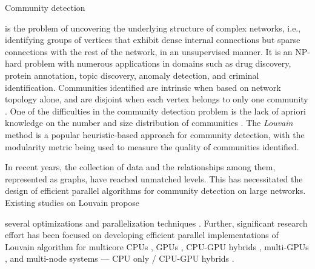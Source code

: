 Community detection is the problem of uncovering the underlying structure of complex networks, i.e., identifying groups of vertices that exhibit dense internal connections but sparse connections with the rest of the network, in an unsupervised manner. It is an NP-hard problem with numerous applications in domains such as drug discovery, protein annotation, topic discovery, anomaly detection, and criminal identification. Communities identified are intrinsic when based on network topology alone, and are disjoint when each vertex belongs to only one community \cite{com-gregory10}. One of the difficulties in the community detection problem is the lack of apriori knowledge on the number and size distribution of communities \cite{com-blondel08}. The \textit{Louvain} method \cite{com-blondel08} is a popular heuristic-based approach for community detection, with the modularity metric \cite{com-newman06} being used to measure the quality of communities identified.

In recent years, the collection of data and the relationships among them, represented as graphs, have reached unmatched levels. This has necessitated the design of efficient parallel algorithms for community detection on large networks. Existing studies on Louvain propose several optimizations \cite{com-rotta11, com-waltman13, com-gach14, com-traag15, com-lu15, com-ryu16, com-ozaki16, com-naim17, com-halappanavar17, com-ghosh18, com-traag19, com-zhang21, com-shi21, com-you22, com-aldabobi22} and parallelization techniques \cite{com-cheong13, com-wickramaarachchi14, com-lu15, com-zeng15, com-que15, com-naim17, com-fazlali17, com-halappanavar17, com-zeitz17, com-ghosh18, com-bhowmik19, com-gheibi20, com-shi21, com-bhowmick22}. Further, significant research effort has been focused on developing efficient parallel implementations of Louvain algorithm for multicore CPUs \cite{staudt2015engineering, staudt2016networkit, com-fazlali17, com-halappanavar17, qie2022isolate}, GPUs \cite{com-naim17}, CPU-GPU hybrids \cite{com-bhowmik19, com-mohammadi20}, multi-GPUs \cite{com-cheong13, hricik2020using, chou2022batched, com-gawande22}, and multi-node systems --- CPU only \cite{com-ghosh18, ghosh2018scalable, sattar2022scalable} / CPU-GPU hybrids \cite{com-bhowmick22}.

